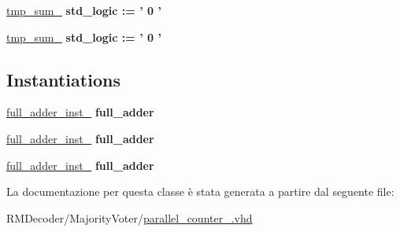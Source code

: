 \begin{DoxyCompactItemize}
\item 
\hypertarget{classparallel__counter__4_1_1_structural_ga638b5ddda538a6bce1b86e07530ad8d1}{\hyperlink{group___majority_voter_ga638b5ddda538a6bce1b86e07530ad8d1}{tmp\+\_\+sum\+\_} {\bfseries \textcolor{vhdlchar}{std\+\_\+logic}\textcolor{vhdlchar}{ }\textcolor{vhdlchar}{ }\textcolor{vhdlchar}{\+:}\textcolor{vhdlchar}{=}\textcolor{vhdlchar}{ }\textcolor{vhdlchar}{ }\textcolor{vhdlchar}{'}\textcolor{vhdlchar}{ } \textcolor{vhdldigit}{0} \textcolor{vhdlchar}{ }\textcolor{vhdlchar}{'}\textcolor{vhdlchar}{ }} }\label{classparallel__counter__4_1_1_structural_ga638b5ddda538a6bce1b86e07530ad8d1}

\item 
\hypertarget{classparallel__counter__4_1_1_structural_gaf1f4ed8f2fb55aed13f16ddd56d6fa7d}{\hyperlink{group___majority_voter_gaf1f4ed8f2fb55aed13f16ddd56d6fa7d}{tmp\+\_\+sum\+\_} {\bfseries \textcolor{vhdlchar}{std\+\_\+logic}\textcolor{vhdlchar}{ }\textcolor{vhdlchar}{ }\textcolor{vhdlchar}{\+:}\textcolor{vhdlchar}{=}\textcolor{vhdlchar}{ }\textcolor{vhdlchar}{ }\textcolor{vhdlchar}{'}\textcolor{vhdlchar}{ } \textcolor{vhdldigit}{0} \textcolor{vhdlchar}{ }\textcolor{vhdlchar}{'}\textcolor{vhdlchar}{ }} }\label{classparallel__counter__4_1_1_structural_gaf1f4ed8f2fb55aed13f16ddd56d6fa7d}

\end{DoxyCompactItemize}
\subsection*{Instantiations}
 \begin{DoxyCompactItemize}
\item 
\hypertarget{classparallel__counter__4_1_1_structural_a7b6b6409c64dbb7942775ff4ffb3bced}{\hyperlink{classparallel__counter__4_1_1_structural_a7b6b6409c64dbb7942775ff4ffb3bced}{full\+\_\+adder\+\_\+inst\+\_}  {\bfseries full\+\_\+adder}   }\label{classparallel__counter__4_1_1_structural_a7b6b6409c64dbb7942775ff4ffb3bced}

\item 
\hypertarget{classparallel__counter__4_1_1_structural_aa5ce8b13a09e2a11010cd03bc37b432b}{\hyperlink{classparallel__counter__4_1_1_structural_aa5ce8b13a09e2a11010cd03bc37b432b}{full\+\_\+adder\+\_\+inst\+\_}  {\bfseries full\+\_\+adder}   }\label{classparallel__counter__4_1_1_structural_aa5ce8b13a09e2a11010cd03bc37b432b}

\item 
\hypertarget{classparallel__counter__4_1_1_structural_a86a61b6c266941969ede704beddbaaa2}{\hyperlink{classparallel__counter__4_1_1_structural_a86a61b6c266941969ede704beddbaaa2}{full\+\_\+adder\+\_\+inst\+\_}  {\bfseries full\+\_\+adder}   }\label{classparallel__counter__4_1_1_structural_a86a61b6c266941969ede704beddbaaa2}

\end{DoxyCompactItemize}


La documentazione per questa classe è stata generata a partire dal seguente file\+:\begin{DoxyCompactItemize}
\item 
R\+M\+Decoder/\+Majority\+Voter/\hyperlink{parallel__counter__4_8vhd}{parallel\+\_\+counter\+\_.\+vhd}\end{DoxyCompactItemize}
